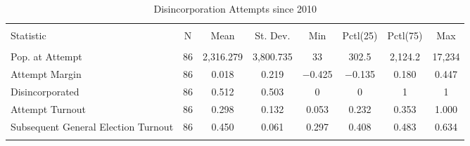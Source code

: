 
\begin{table}[!htbp] \centering 
  \caption{Disincorporation Attempts since 2010} 
  \label{} 
\begin{tabular}{@{\extracolsep{5pt}}lccccccc} 
\\[-1.8ex]\hline 
\hline \\[-1.8ex] 
Statistic & \multicolumn{1}{c}{N} & \multicolumn{1}{c}{Mean} & \multicolumn{1}{c}{St. Dev.} & \multicolumn{1}{c}{Min} & \multicolumn{1}{c}{Pctl(25)} & \multicolumn{1}{c}{Pctl(75)} & \multicolumn{1}{c}{Max} \\ 
\hline \\[-1.8ex] 
Pop. at Attempt & 86 & 2,316.279 & 3,800.735 & 33 & 302.5 & 2,124.2 & 17,234 \\ 
Attempt Margin & 86 & 0.018 & 0.219 & $-$0.425 & $-$0.135 & 0.180 & 0.447 \\ 
Disincorporated & 86 & 0.512 & 0.503 & 0 & 0 & 1 & 1 \\ 
Attempt Turnout & 86 & 0.298 & 0.132 & 0.053 & 0.232 & 0.353 & 1.000 \\ 
Subsequent General Election Turnout & 86 & 0.450 & 0.061 & 0.297 & 0.408 & 0.483 & 0.634 \\ 
\hline \\[-1.8ex] 
\end{tabular} 
\end{table} 
